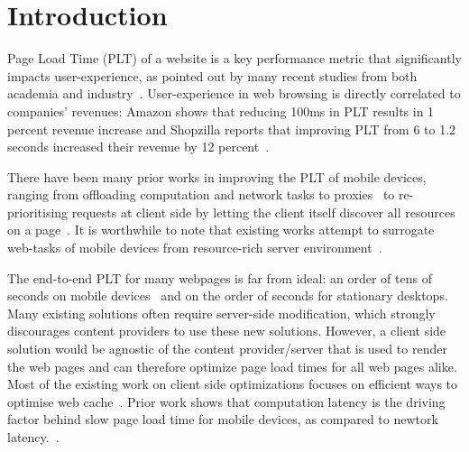\section{Introduction}
\label{sec:intro}

Page Load Time (PLT) of a website is a key performance metric that
significantly impacts user-experience, as pointed out by many recent studies
from both academia and industry~\cite{bhatti2000integrating, bouch2000quality}.
User-experience in web browsing is directly correlated to companies' revenues:
Amazon shows that reducing 100ms in PLT results in 1 percent revenue increase
and Shopzilla reports that improving PLT from 6 to 1.2 seconds increased their
revenue by 12 percent~\cite{url3}. 

There have been many prior works in improving the PLT of mobile devices,
ranging from offloading computation and network tasks to
proxies~\cite{netravali2015mahimahi, sivakumar2014parcel, wang2014speedy} to
re-prioritising requests at client side by letting the client itself discover
all resources on a page~\cite{butkiewicz2015klotski, netravali2016polaris}.  It
is worthwhile to note that existing works attempt to surrogate web-tasks of
mobile devices from resource-rich server
environment~\cite{ruamviboonsuk2017vroom}.
 
The end-to-end PLT for many webpages is far from ideal: an order
of tens of seconds on mobile devices~\cite{wang2013demystifying} and
on the order of seconds for stationary desktops.  Many existing solutions
often require server-side modification, which strongly discourages
content providers to use these new solutions. 
However, a client side solution would be agnostic of the content
provider/server that is used to render the web pages and
can therefore optimize page load times for all web pages alike. 
Most of the existing work on client side optimizations focuses on efficient ways to
optimise web cache~\cite{wang2014much}.  
Prior work shows that computation latency is the driving factor behind slow page load time for mobile devices, as compared to newtork latency.~\cite{vesuna2016caching}.

